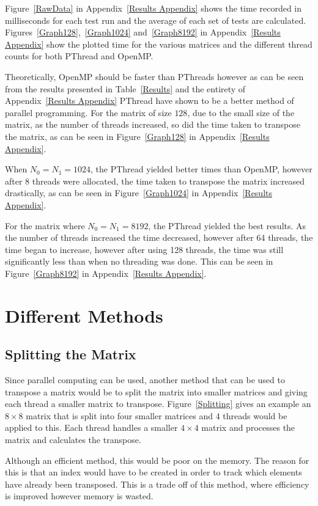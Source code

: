 \documentclass[10pt, conference]{IEEEtran}
\begin{document}
Figure~\ref{RawData} in Appendix~\ref{Results Appendix} shows the time recorded in milliseconds for each test run and the average of each set of tests are calculated. Figures~\ref{Graph128},~\ref{Graph1024} and~\ref{Graph8192} in Appendix~\ref{Results Appendix} show the plotted time for the various matrices and the different thread counts for both PThread and OpenMP.

Theoretically, OpenMP should be faster than PThreads however as can be seen from the results presented in Table~\ref{Results} and the entirety of Appendix~\ref{Results Appendix} PThread have shown to be a better method of parallel programming. For the matrix of size $128$, due to the small size of the matrix, as the number of threads increased, so did the time taken to transpose the matrix, as can be seen in Figure~\ref{Graph128} in Appendix~\ref{Results Appendix}.

When $N_0 = N_1 = 1024$, the PThread yielded better times than OpenMP, however after 8 threads were allocated, the time taken to transpose the matrix increased drastically, as can be seen in Figure~\ref{Graph1024} in Appendix~\ref{Results Appendix}.

For the matrix where $N_0 = N_1 = 8192$, the PThread yielded the best results. As the number of threads increased the time decreased, however after 64 threads, the time began to increase, however after using 128 threads, the time was still significantly less than when no threading was done. This can be seen in Figure~\ref{Graph8192} in Appendix~\ref{Results Appendix}.

\section{Different Methods}
\label{Different Methods}

\subsection{Splitting the Matrix}
\label{Splitting the Matrix}
Since parallel computing can be used, another method that can be used to transpose a matrix would be to split the matrix into smaller matrices and giving each thread a smaller matrix to transpose. Figure~\ref{Splitting} gives an example an $8\times8$ matrix that is split into four smaller matrices and 4 threads would be applied to this. Each thread handles a smaller $4\times4$ matrix and processes the matrix and calculates the transpose.

Although an efficient method, this would be poor on the memory. The reason for this is that an index would have to be created in order to track which elements have already been transposed. This is a trade off of this method, where efficiency is improved however memory is wasted.
\end{document}
